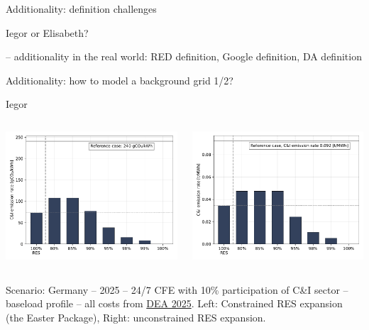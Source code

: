 \begin{frame}{Additionality: definition challenges}

  Iegor or Elisabeth?

  -- additionality in the real world: RED definition, Google definition, DA definition\\

\end{frame}


\begin{frame}{Additionality: how to model a background grid 1/2?}

  Iegor

  \begin{columns}
    \begin{column}{7cm}
      \includegraphics[width=7.5cm]{images/10-2025-DE-p3-ci_emisrate.pdf}
    \end{column}
    \begin{column}{7cm}
      \includegraphics[width=7.5cm]{images/ci_emisrate.pdf}
    \end{column}
  \end{columns}

  Scenario: Germany -- 2025 -- 24/7 CFE with 10\% participation of C\&I sector -- baseload profile -- all costs from \href{https://ens.dk/en/our-services/technology-catalogues}{DEA 2025}. Left: Constrained RES expansion (the Easter Package), Right: unconstrained RES expansion.
\end{frame}


